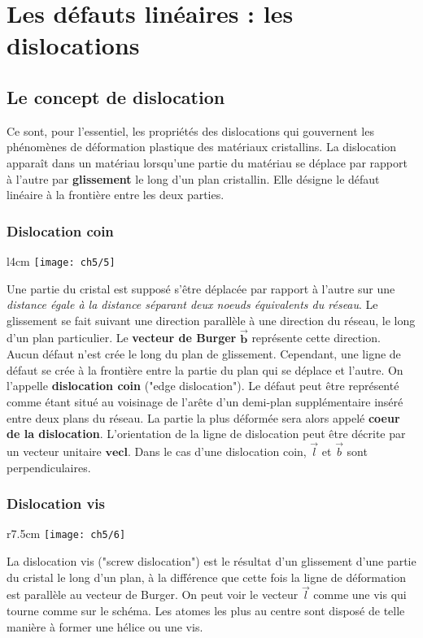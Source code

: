 \section{Les défauts linéaires : les dislocations}
	\subsection{Le concept de dislocation}
	Ce sont, pour l'essentiel, les propriétés des dislocations qui gouvernent les phénomènes de déformation plastique des matériaux cristallins. La dislocation apparaît dans un matériau lorsqu'une partie du matériau se déplace par rapport à l'autre par \textbf{glissement} le long d'un plan cristallin. Elle désigne le défaut linéaire à la frontière entre les deux parties. 
	
	\newpage
	\subsubsection{Dislocation coin}
	\begin{wrapfigure}[12]{l}{4cm}
	\vspace{-5mm}
	\texttt{[image: ch5/5]}
	\end{wrapfigure}
	Une partie du cristal est supposé s'être déplacée par rapport à l'autre sur une \textit{distance égale à la distance séparant deux noeuds équivalents du réseau}. Le glissement se fait suivant une direction parallèle à une direction du réseau, le long d'un plan particulier. Le \textbf{vecteur de Burger} $\mathbf{\vec{b}}$ représente cette direction. Aucun défaut n'est crée le long du plan de glissement. Cependant, une ligne de défaut se crée à la frontière entre la partie du plan qui se déplace et l'autre. On l'appelle \textbf{dislocation coin} ("edge dislocation"). Le défaut peut être représenté comme étant situé au voisinage de l'arête d'un demi-plan supplémentaire inséré entre deux plans du réseau. La partie la plus déformée sera alors appelé \textbf{coeur de la dislocation}. L'orientation de la ligne de dislocation peut être décrite par un vecteur unitaire $\mathbf{vec{l}}$. Dans le cas d'une dislocation coin, $\vec{l}$ et $\vec{b}$ sont perpendiculaires. 
	
	\subsubsection{Dislocation vis}
	\begin{wrapfigure}[7]{r}{7.5cm}
	\vspace{-5mm}
	\texttt{[image: ch5/6]}
	\end{wrapfigure}
	La dislocation vis ("screw dislocation") est le résultat d'un glissement d'une partie du cristal le long d'un plan, à la différence que cette fois la ligne de déformation est parallèle au vecteur de Burger. On peut voir le vecteur $\vec{l}$ comme une vis qui tourne comme sur le schéma. Les atomes les plus au centre sont disposé de telle manière à former une hélice ou une vis. 
	

